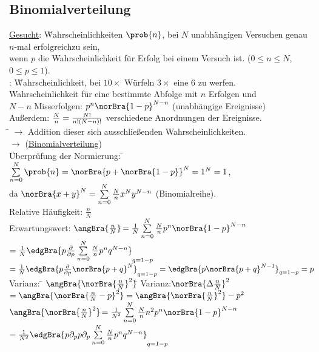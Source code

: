 \subsection{Binomialverteilung}
\begin{tabbing}
\underline{Gesucht}: \= Wahrscheinlichkeiten $\prob{n}$, bei $N$ unabhängigen Versuchen genau $n$-mal \glqq erfolgreich\grqq zu sein,\\
\> wenn $p$ die Wahrscheinlichkeit für Erfolg bei einem Versuch ist. ($0 \leq n \leq N$, $0 \leq p \leq 1$).\\
: \=Wahrscheinlichkeit, bei $10\times$ Würfeln $3\times$ eine $6$ zu werfen.\\
\>Wahrscheinlichkeit für eine bestimmte Abfolge mit $n$ Erfolgen und\\
\> $N-n$ Misserfolgen: $p^n \norBra{1-p}^{N-n}$ (unabhängige Ereignisse)\\
Außerdem: ${N \over n} = \frac{N!}{n! (N-n)!}$ verschiedene Anordnungen der Ereignisse.\\
\hspace{4em} \= \kill
$\rightarrow$\> Addition dieser sich ausschließenden Wahrscheinlichkeiten.\\
$\rightarrow$\>  (\underline{Binomialverteilung})\\
Überprüfung der Normierung: \=$\sum\limits_{n = 0}^N \prob{n} = \norBra{p +\norBra{1-p}}^N = 1^N = 1$,\\\> da $\norBra{x+y}^N = \sum\limits_{n = 0}^N {N \over n} x^N y^{N-n}$ (Binomialreihe).\\
Relative Häufigkeit: $\frac{n}{N}$\\
Erwartungswert: $\angBra{\frac{n}{N}}$\=$=\frac1N \sum\limits_{n=0}^N {N \over n} p^n \norBra{1-p}^{N-n}$\\
\> $=\frac1N\edgBra{p \frac\partial{\partial p} \sum\limits_{n=0}^N {N\over n} p^n q^{N-n}}_{q = 1-p}$\\
\> $= \frac1N \edgBra{p \frac\partial{\partial p} \norBra{p +q}^N}_{q = 1-p} = \edgBra{p \norBra{p+q}^{N-1}}_{q = 1-p} = p$\\
Varianz: \= $\angBra{\norBra{\frac{n}{N}}^2}$\= \kill
Varianz:\>$\norBra{\Delta\frac{n}{N}}^2$\>$=\angBra{\norBra{\frac{n}{N} -p}^2} = \angBra{\norBra{\frac{n}{N}}^2} - p^2$\\
\>$\angBra{\norBra{\frac{n}{N}}^2}$\>$=\frac1{N^2} \sum\limits_{n=0}^N {N\over n} n^2 p^n \norBra{1-p}^{N-n}$\\
\>\>$=\frac1{N^2}\edgBra{p\partial_p p\partial_p \sum\limits_{n=0}^N {N\over n} p^n q^{N-n}}_{q = 1-p}$\\

\end{tabbing}
